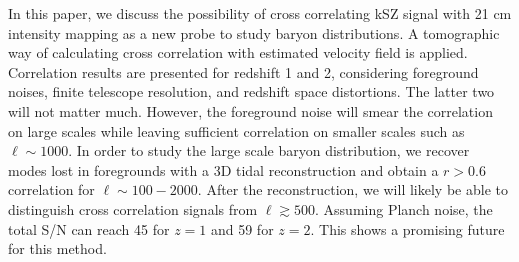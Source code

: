In this paper, we discuss the possibility of cross correlating kSZ signal with 
21 cm intensity mapping as a new probe to study baryon distributions. 
A tomographic way of calculating cross correlation with estimated velocity field is applied.  
Correlation results are presented for redshift 1 and 2, considering foreground noises, 
finite telescope resolution, and redshift space distortions. 
The latter two will not matter much. 
However, the foreground noise will smear the correlation on large scales while leaving sufficient correlation on smaller scales such as $\ell\sim 1000$. 
In order to study the large scale baryon distribution, we recover modes lost in foregrounds 
with a 3D tidal reconstruction and obtain a $r>0.6$ correlation for $\ell\sim 100-2000$. 
After the reconstruction, we will likely be able to distinguish cross correlation signals from $\ell\gtrsim 500$. 
Assuming Planch noise, the total S/N can reach 45 for $z=1$ and 59 for $z=2$. 
This shows a promising future for this method.
 
